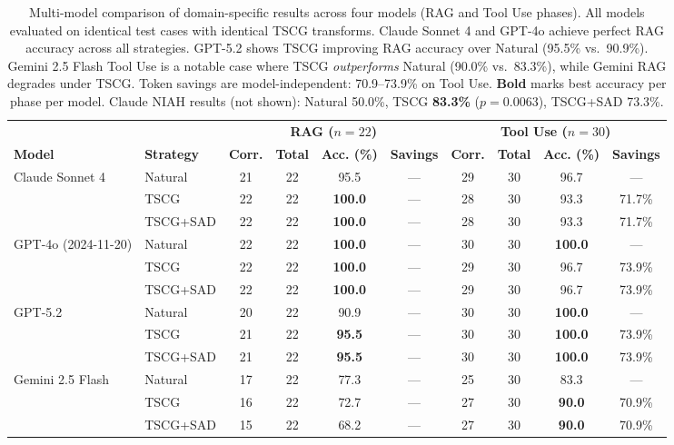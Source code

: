 \begin{table}[t]
\centering
\small
\begin{tabular}{@{}l l cccc cccc@{}}
\toprule
& & \multicolumn{4}{c}{\textbf{RAG ($n=22$)}} & \multicolumn{4}{c}{\textbf{Tool Use ($n=30$)}} \\
\cmidrule(lr){3-6} \cmidrule(lr){7-10}
\textbf{Model} & \textbf{Strategy} & \textbf{Corr.} & \textbf{Total} & \textbf{Acc. (\%)} & \textbf{Savings} & \textbf{Corr.} & \textbf{Total} & \textbf{Acc. (\%)} & \textbf{Savings} \\
\midrule
\multirow{3}{*}{Claude Sonnet 4}
    & Natural   & 21 & 22 & 95.5 & ---   & 29 & 30 & 96.7 & --- \\
    & TSCG      & 22 & 22 & \textbf{100.0} & --- & 28 & 30 & 93.3 & 71.7\% \\
    & TSCG+SAD  & 22 & 22 & \textbf{100.0} & --- & 28 & 30 & 93.3 & 71.7\% \\
\midrule
\multirow{3}{*}{GPT-4o (2024-11-20)}
    & Natural   & 22 & 22 & \textbf{100.0} & --- & 30 & 30 & \textbf{100.0} & --- \\
    & TSCG      & 22 & 22 & \textbf{100.0} & --- & 29 & 30 & 96.7 & 73.9\% \\
    & TSCG+SAD  & 22 & 22 & \textbf{100.0} & --- & 29 & 30 & 96.7 & 73.9\% \\
\midrule
\multirow{3}{*}{GPT-5.2}
    & Natural   & 20 & 22 & 90.9 & ---   & 30 & 30 & \textbf{100.0} & --- \\
    & TSCG      & 21 & 22 & \textbf{95.5} & --- & 30 & 30 & \textbf{100.0} & 73.9\% \\
    & TSCG+SAD  & 21 & 22 & \textbf{95.5} & --- & 30 & 30 & \textbf{100.0} & 73.9\% \\
\midrule
\multirow{3}{*}{Gemini 2.5 Flash}
    & Natural   & 17 & 22 & 77.3 & ---   & 25 & 30 & 83.3 & --- \\
    & TSCG      & 16 & 22 & 72.7 & ---   & 27 & 30 & \textbf{90.0} & 70.9\% \\
    & TSCG+SAD  & 15 & 22 & 68.2 & ---   & 27 & 30 & \textbf{90.0} & 70.9\% \\
\bottomrule
\end{tabular}
\caption{Multi-model comparison of domain-specific results across four models (RAG and Tool Use phases). All models evaluated on identical test cases with identical TSCG transforms. Claude Sonnet 4 and GPT-4o achieve perfect RAG accuracy across all strategies. GPT-5.2 shows TSCG improving RAG accuracy over Natural (95.5\% vs.\ 90.9\%). Gemini 2.5 Flash Tool Use is a notable case where TSCG \emph{outperforms} Natural (90.0\% vs.\ 83.3\%), while Gemini RAG degrades under TSCG. Token savings are model-independent: 70.9--73.9\% on Tool Use. \textbf{Bold} marks best accuracy per phase per model. Claude NIAH results (not shown): Natural 50.0\%, TSCG \textbf{83.3\%} ($p=0.0063$), TSCG+SAD 73.3\%.}
\label{tab:multimodel-results}
\end{table}

